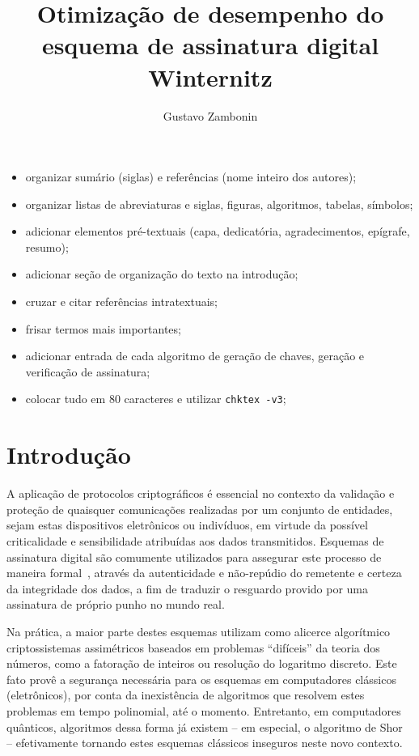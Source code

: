 \documentclass[12pt]{report}
\title{
  Otimização de desempenho do esquema de assinatura digital Winternitz
}
\author{Gustavo Zambonin}
\date{}
\begin{document}
\maketitle

\tableofcontents

\newpage

{\huge
\begin{itemize}
    \item organizar sumário (siglas) e referências (nome inteiro dos autores);
    \item organizar listas de abreviaturas e siglas, figuras, algoritmos, tabelas, símbolos;
    \item adicionar elementos pré-textuais (capa, dedicatória, agradecimentos, epígrafe, resumo);
    \item adicionar seção de organização do texto na introdução;
    \item cruzar e citar referências intratextuais;
    \item frisar termos mais importantes;
    \item adicionar entrada de cada algoritmo de geração de chaves, geração e verificação de assinatura;
    \item colocar tudo em 80 caracteres e utilizar \texttt{chktex -v3};
\end{itemize}
}

\newpage

\chapter{Introdução}

A aplicação de protocolos criptográficos é essencial no contexto da validação e
proteção de quaisquer comunicações realizadas por um conjunto de entidades,
sejam estas dispositivos eletrônicos ou indivíduos, em virtude da possível
criticalidade e sensibilidade atribuídas aos dados transmitidos. Esquemas de
assinatura digital são comumente utilizados para assegurar este processo de
maneira formal~\cite{Goldreich:2004:FCV:975541}, através da autenticidade e
não-repúdio do remetente e certeza da integridade dos dados, a fim de traduzir
o resguardo provido por uma assinatura de próprio punho no mundo real.

Na prática, a maior parte destes esquemas utilizam como alicerce algorítmico
criptossistemas assimétricos baseados em problemas ``difíceis'' da teoria dos
números, como a fatoração de inteiros ou resolução do logaritmo discreto.
Este fato provê a segurança necessária para os esquemas
em computadores clássicos (eletrônicos), por conta da inexistência de
algoritmos que resolvem estes problemas em tempo polinomial, até o momento.
Entretanto, em computadores quânticos, algoritmos dessa forma já existem -- em
especial, o algoritmo de Shor~\cite{Shor:1997:PAP:264393.264406} --
efetivamente tornando estes esquemas clássicos inseguros neste novo contexto.
\end{document}
